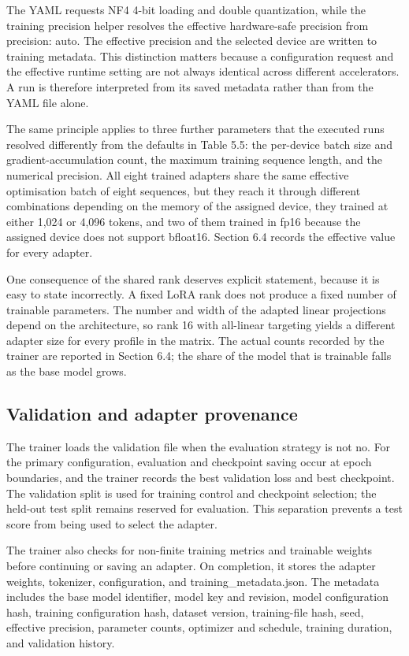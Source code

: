 The YAML requests NF4 4-bit loading and double quantization, while the training precision helper resolves the effective hardware-safe precision from precision: auto. The effective precision and the selected device are written to training metadata. This distinction matters because a configuration request and the effective runtime setting are not always identical across different accelerators. A run is therefore interpreted from its saved metadata rather than from the YAML file alone.

The same principle applies to three further parameters that the executed runs resolved differently from the defaults in Table 5.5: the per-device batch size and gradient-accumulation count, the maximum training sequence length, and the numerical precision. All eight trained adapters share the same effective optimisation batch of eight sequences, but they reach it through different combinations depending on the memory of the assigned device, they trained at either 1,024 or 4,096 tokens, and two of them trained in fp16 because the assigned device does not support bfloat16. Section 6.4 records the effective value for every adapter.

One consequence of the shared rank deserves explicit statement, because it is easy to state incorrectly. A fixed LoRA rank does not produce a fixed number of trainable parameters. The number and width of the adapted linear projections depend on the architecture, so rank 16 with all-linear targeting yields a different adapter size for every profile in the matrix. The actual counts recorded by the trainer are reported in Section 6.4; the share of the model that is trainable falls as the base model grows.

\subsection{Validation and adapter provenance}

The trainer loads the validation file when the evaluation strategy is not no. For the primary configuration, evaluation and checkpoint saving occur at epoch boundaries, and the trainer records the best validation loss and best checkpoint. The validation split is used for training control and checkpoint selection; the held-out test split remains reserved for evaluation. This separation prevents a test score from being used to select the adapter.

The trainer also checks for non-finite training metrics and trainable weights before continuing or saving an adapter. On completion, it stores the adapter weights, tokenizer, configuration, and training\_metadata.json. The metadata includes the base model identifier, model key and revision, model configuration hash, training configuration hash, dataset version, training-file hash, seed, effective precision, parameter counts, optimizer and schedule, training duration, and validation history.

